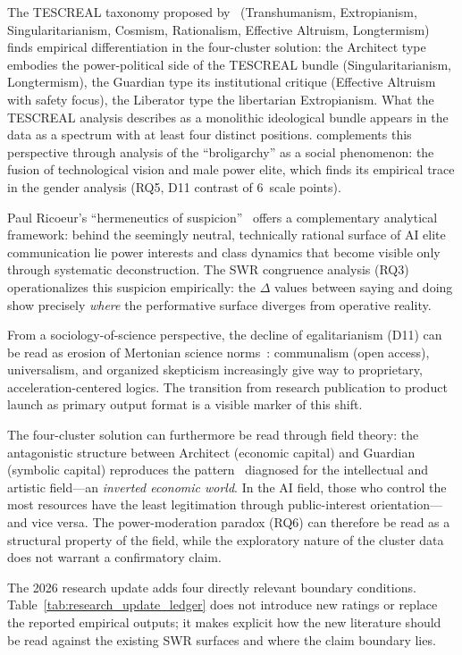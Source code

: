 \documentclass[12pt,a4paper]{article}
\begin{document}
The TESCREAL taxonomy proposed by~\citet{TorresGebru2024} (Transhumanism, Extropianism, Singularitarianism, Cosmism, Rationalism, Effective Altruism, Longtermism) finds empirical differentiation in the four-cluster solution: the Architect type embodies the power-political side of the TESCREAL bundle (Singularitarianism, Longtermism), the Guardian type its institutional critique (Effective Altruism with safety focus), the Liberator type the libertarian Extropianism. What the TESCREAL analysis describes as a monolithic ideological bundle appears in the data as a spectrum with at least four distinct positions. \citet{Becker2025} complements this perspective through analysis of the ``broligarchy'' as a social phenomenon: the fusion of technological vision and male power elite, which finds its empirical trace in the gender analysis (RQ5, D11 contrast of 6~scale points).

Paul Ricoeur's ``hermeneutics of suspicion''~\citep{Ricoeur1970} offers a complementary analytical framework: behind the seemingly neutral, technically rational surface of AI elite communication lie power interests and class dynamics that become visible only through systematic deconstruction. The SWR congruence analysis (RQ3) operationalizes this suspicion empirically: the $\Delta$ values between saying and doing show precisely \emph{where} the performative surface diverges from operative reality.

From a sociology-of-science perspective, the decline of egalitarianism (D11) can be read as erosion of Mertonian science norms~\citep{Merton1973}: communalism (open access), universalism, and organized skepticism increasingly give way to proprietary, acceleration-centered logics. The transition from research publication to product launch as primary output format is a visible marker of this shift.

The four-cluster solution can furthermore be read through field theory: the antagonistic structure between Architect (economic capital) and Guardian (symbolic capital) reproduces the pattern~\citet{Bourdieu1992} diagnosed for the intellectual and artistic field---an \emph{inverted economic world}. In the AI field, those who control the most resources have the least legitimation through public-interest orientation---and vice versa. The power-moderation paradox (RQ6) can therefore be read as a structural property of the field, while the exploratory nature of the cluster data does not warrant a confirmatory claim.

The 2026 research update adds four directly relevant boundary conditions. Table~\ref{tab:research_update_ledger} does not introduce new ratings or replace the reported empirical outputs; it makes explicit how the new literature should be read against the existing SWR surfaces and where the claim boundary lies.
\end{document}
